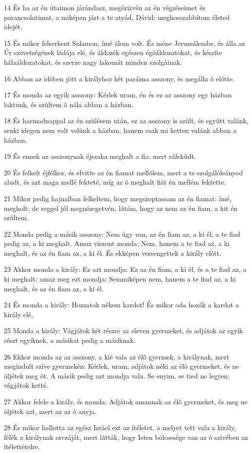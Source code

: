 \par 14 És ha az én útaimon járándasz, megõrizvén az én végzéseimet és parancsolatimat, a miképen járt a te atyád, Dávid: meghosszabbítom életed idejét.
\par 15 És mikor felserkent Salamon, ímé álom volt. És méne Jeruzsálembe, és álla az Úr szövetségének ládája elé, és áldozék egészen égõáldozatokat, és készíte hálaáldozatokat, és szerze nagy lakomát minden szolgáinak.
\par 16 Abban az idõben jött a királyhoz két parázna asszony, és megálla õ elõtte.
\par 17 És monda az egyik asszony: Kérlek uram, én és ez az asszony egy házban laktunk, és szültem õ nála abban a házban.
\par 18 És harmadnappal az én szülésem után, ez az asszony is szült, és együtt valánk, senki idegen nem volt velünk a házban, hanem csak mi ketten valánk abban a házban.
\par 19 És ennek az asszonynak éjszaka meghalt a fia: mert ráfeküdt.
\par 20 És felkelt éjfélkor, és elvitte az én fiamat mellõlem, mert a te szolgálóleányod aludt, és azt maga mellé fekteté, míg az õ meghalt fiát én mellém fektette.
\par 21 Mikor pedig hajnalban felkeltem, hogy megszoptassam az én fiamat: ímé, megholt; de reggel jól megnézegetvén, látám, hogy az nem az én fiam, a kit én szültem.
\par 22 Monda pedig a másik asszony: Nem úgy van, az én fiam az, a ki él, a te fiad pedig az, a ki meghalt. Amaz viszont monda: Nem, hanem a te fiad az, a ki meghalt, és az én fiam az, a ki él. És ekképen versengettek a király elõtt.
\par 23 Akkor monda a király: Ez azt mondja: Ez az én fiam, a ki él, és a te fiad az, a ki meghalt; amaz meg ezt mondja: Semmiképen nem, hanem a te fiad az, a ki meghalt, és az én fiam az, a ki él.
\par 24 És monda a király: Hozzatok nékem kardot! És mikor oda hozák a kardot a király elé,
\par 25 Monda a király: Vágjátok két részre az eleven gyermeket, és adjátok az egyik részt egyiknek, a másikat pedig a másiknak.
\par 26 Ekkor monda az az asszony, a kié vala az élõ gyermek, a királynak, mert megindult szíve gyermekén: Kérlek, uram, adjátok néki az élõ gyermeket, és ne öljétek meg õt. A másik pedig azt mondja vala. Se enyim, se tied ne legyen; vágjátok ketté.
\par 27 Akkor felele a király, és monda: Adjátok amannak az élõ gyermeket, és meg ne öljétek azt, mert az az õ anyja.
\par 28 És mikor hallotta az egész Izráel ezt az ítéletet, a melyet tett vala a király, félék a királynak orczáját, mert látták, hogy Isten bölcsesége van az õ szívében az ítélettételre.

